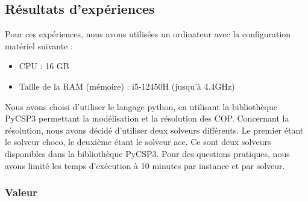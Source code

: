 \documentclass[a4paper, 10pt]{article}
\begin{document}
    \subsection{Résultats d'expériences}

      Pour ces expériences, nous avons utilisées un ordinateur avec la configuration matériel suivante :
      \begin{itemize}
        \item CPU : 16 GB
        \item Taille de la RAM (mémoire) : i5-12450H  (jusqu'à 4.4GHz)
      \end{itemize}

      Nous avons choisi d'utiliser le langage python, en utilisant la bibliothèque PyCSP3 permettant la modélisation et la résolution des COP. Concernant la résolution, nous avons décidé d'utiliser deux solveurs différents. Le premier étant le solveur choco, le deuxième étant le solveur ace. Ce sont deux solveurs disponibles dans la bibliothèque PyCSP3. Pour des questions pratiques, nous avons limité les temps d'exécution à 10 minutes par instance et par solveur.

      \subsubsection{Valeur}
\end{document}
